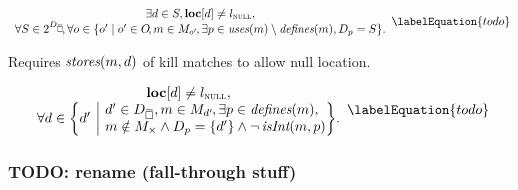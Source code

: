 

\begin{equation}
  \begin{array}{c}
    \exists d \in S, \mVar{loc}[d] \neq \mNullLocation, \\
    \forall S \in \mPowerset{\mStateDataCompSet} \hspace{-2pt},
    \forall o \in
      \mSetBuilder{o'}%
                  {%
                    o' \in \mOpSet \!,
                    m \in \mMatchSet[o'] \hspace{-1pt},
                    \exists p \in \mUses(m) \setminus \mDefines(m),
                    \mDataSet[p] = S
                  }.
  \end{array}
  \labelEquation{todo}
\end{equation}

Requires \mbox{$\operatorname{\textit{stores}}(m, d)$} of kill matches to allow null location.


%
%

\begin{equation}
  \begin{array}{c}
    \mVar{loc}[d] \neq \mNullLocation, \\
    \forall d \in
      \mSetBuilder*{d'}%
                   {%
                     \begin{array}{@{}l@{}}
                       d' \in \mStateDataCompSet,
                       m \in \mMatchSet[d'] \hspace{-1pt},
                       \exists p \in \mDefines(m), \\
                       m \notin \mKillMatchSet
                       \mAnd
                       \mDataSet[p] = \mSet{d'}
                       \mAnd
                       \neg\mIsInt(m, p)
                     \end{array}
                   } \!.
  \end{array}
  \labelEquation{todo}
\end{equation}


\subsubsection{TODO: rename (fall-through stuff)}

